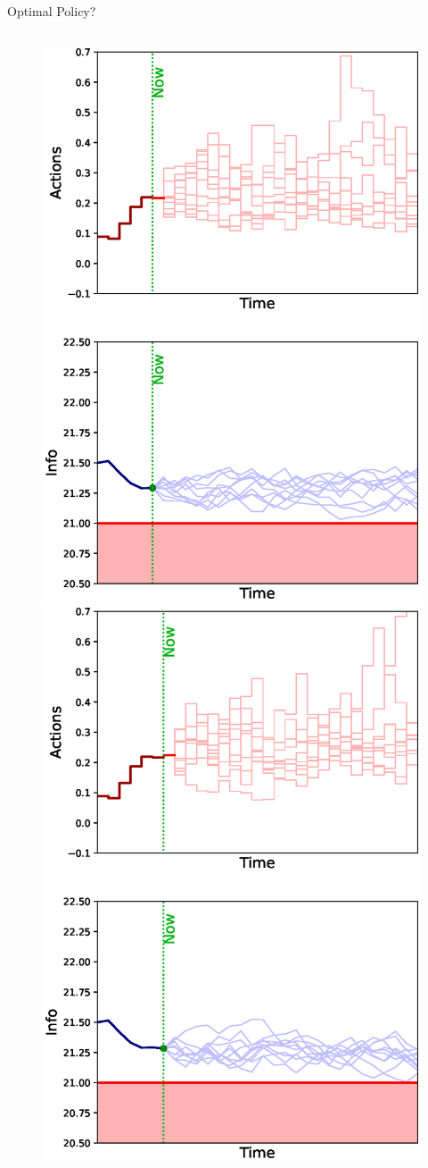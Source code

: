 \documentclass[lecture]{beamer}
\begin{document}
\begin{frame}{\normalsize Optimal Policy?}
\begin{columns}[t]
{\begin{overlayarea}{\textwidth}{0.8\textheight}
\begin{figure}
{        }%
        {%
          \includegraphics[width=.8\textwidth]{Codes/Basics/Policy5.eps}%
        }%
        {%
          \includegraphics[width=.8\textwidth]{Codes/Basics/Policy6.eps}%
}
\end{figure}
\end{overlayarea}}
\end{columns}
\end{frame}
\end{document}
